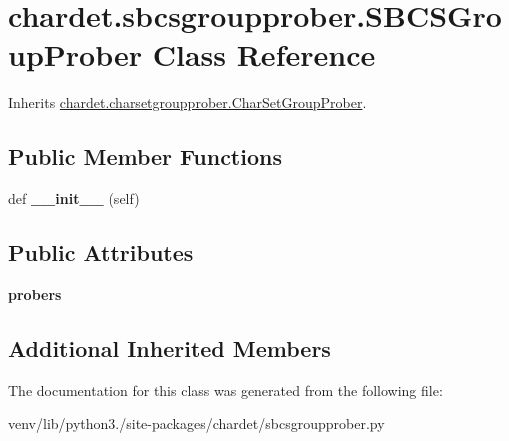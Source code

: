\hypertarget{classchardet_1_1sbcsgroupprober_1_1_s_b_c_s_group_prober}{}\section{chardet.\+sbcsgroupprober.\+S\+B\+C\+S\+Group\+Prober Class Reference}
\label{classchardet_1_1sbcsgroupprober_1_1_s_b_c_s_group_prober}


Inherits \hyperlink{classchardet_1_1charsetgroupprober_1_1_char_set_group_prober}{chardet.\+charsetgroupprober.\+Char\+Set\+Group\+Prober}.

\subsection*{Public Member Functions}
\begin{DoxyCompactItemize}
\item 
\mbox{\label{classchardet_1_1sbcsgroupprober_1_1_s_b_c_s_group_prober_a083f0ac352adc5e24787bce82b1af161}} 
def {\bfseries \+\_\+\+\_\+init\+\_\+\+\_\+} (self)
\end{DoxyCompactItemize}
\subsection*{Public Attributes}
\begin{DoxyCompactItemize}
\item 
\mbox{\label{classchardet_1_1sbcsgroupprober_1_1_s_b_c_s_group_prober_a2788e9f06b28ff79df187c53ce1a626f}} 
{\bfseries probers}
\end{DoxyCompactItemize}
\subsection*{Additional Inherited Members}


The documentation for this class was generated from the following file\+:\begin{DoxyCompactItemize}
\item 
venv/lib/python3./site-\/packages/chardet/sbcsgroupprober.\+py\end{DoxyCompactItemize}
